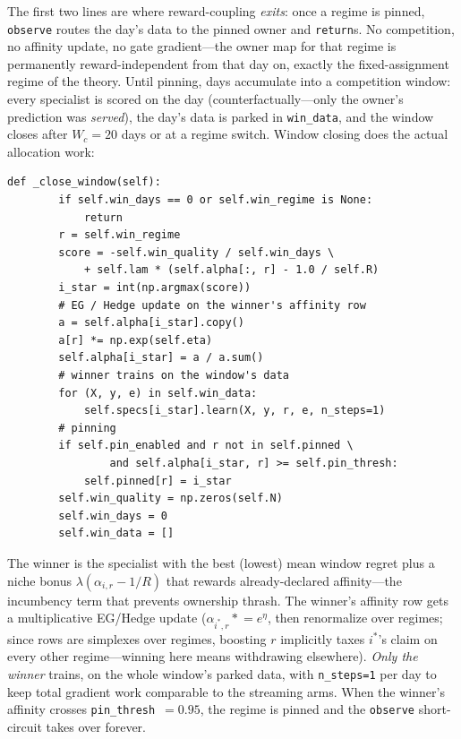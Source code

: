 The first two lines are where reward-coupling \emph{exits}: once a regime is
pinned, \texttt{observe} routes the day's data to the pinned owner and
\texttt{return}s. No competition, no affinity update, no gate
gradient---the owner map for that regime is permanently
reward-independent from that day on, exactly the fixed-assignment regime of
the theory. Until pinning, days accumulate into a competition window: every
specialist is scored on the day (counterfactually---only the owner's
prediction was \emph{served}), the day's data is parked in
\texttt{win\_data}, and the window closes after $W_c = 20$ days or at a
regime switch. Window closing does the actual allocation work:

\begin{lstlisting}[caption={\texttt{RISPArm.\_close\_window}: EG update, winner-trains, pinning (\texttt{risp.py}).},label={lst:dd6-nmclose}]
    def _close_window(self):
        if self.win_days == 0 or self.win_regime is None:
            return
        r = self.win_regime
        score = -self.win_quality / self.win_days \
            + self.lam * (self.alpha[:, r] - 1.0 / self.R)
        i_star = int(np.argmax(score))
        # EG / Hedge update on the winner's affinity row
        a = self.alpha[i_star].copy()
        a[r] *= np.exp(self.eta)
        self.alpha[i_star] = a / a.sum()
        # winner trains on the window's data
        for (X, y, e) in self.win_data:
            self.specs[i_star].learn(X, y, r, e, n_steps=1)
        # pinning
        if self.pin_enabled and r not in self.pinned \
                and self.alpha[i_star, r] >= self.pin_thresh:
            self.pinned[r] = i_star
        self.win_quality = np.zeros(self.N)
        self.win_days = 0
        self.win_data = []
\end{lstlisting}

The winner is the specialist with the best (lowest) mean window regret plus
a niche bonus $\lambda(\alpha_{i,r} - 1/R)$ that rewards already-declared
affinity---the incumbency term that prevents ownership thrash. The winner's
affinity row gets a multiplicative EG/Hedge update
($\alpha_{i^*, r} \mathrel{*}= e^{\eta}$, then renormalize over regimes;
since rows are simplexes over regimes, boosting $r$ implicitly taxes
$i^*$'s claim on every other regime---winning here means withdrawing
elsewhere). \emph{Only the winner} trains, on the whole window's parked
data, with \texttt{n\_steps=1} per day to keep total gradient work
comparable to the streaming arms. When the winner's affinity crosses
\texttt{pin\_thresh}~$=0.95$, the regime is pinned and the
\texttt{observe} short-circuit takes over forever.

